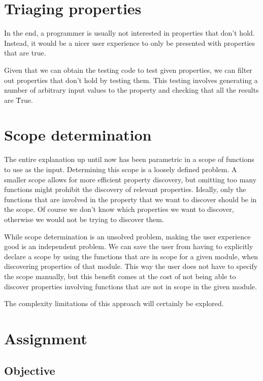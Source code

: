 \documentclass[a4paper, 11pt, onepage]{article}
\begin{document}
\section{Triaging properties}

In the end, a programmer is usually not interested in properties that don't hold.
Instead, it would be a nicer user experience to only be presented with properties that are true.

Given that we can obtain the testing code to test given properties, we can filter out properties that don't hold by testing them.
This testing involves generating a number of arbitrary input values to the property and checking that all the results are \h{True}.


\section{Scope determination}

The entire explanation up until now has been parametric in a scope of functions to use as the input.
Determining this scope is a loosely defined problem.
A smaller scope allows for more efficient property discovery, but omitting too many functions might prohibit the discovery of relevant properties.
Ideally, only the functions that are involved in the property that we want to discover should be in the scope.
Of course we don't know which properties we want to discover, otherwise we would not be trying to discover them.

While scope determination is an unsolved problem, making the user experience good is an independent problem.
We can save the user from having to explicitly declare a scope by using the functions that are in scope for a given module, when discovering properties of that module.
This way the user does not have to specify the scope manually, but this benefit comes at the cost of not being able to discover properties involving functions that are not in scope in the given module.

The complexity limitations of this approach will certainly be explored. 


\section{Assignment}

\subsection{Objective}
\end{document}
